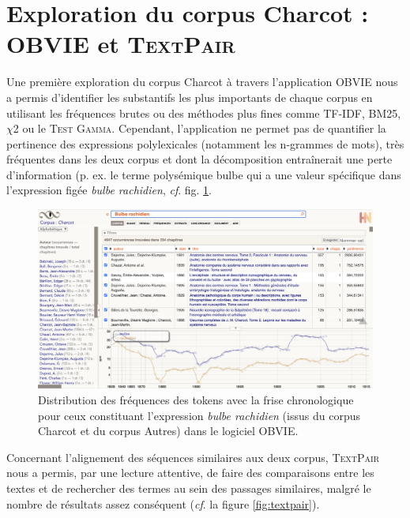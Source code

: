 \label{resultats}

\section{Exploration du corpus Charcot : \textsc{OBVIE} et \textsc{TextPair}}
Une première exploration du corpus Charcot à travers l'application OBVIE nous a permis d'identifier les substantifs les plus importants de chaque corpus en utilisant les fréquences brutes ou des méthodes plus fines comme \textsc{TF-IDF}, \textsc{BM25}, \textsc{$\chi$2} ou le \textsc{Test Gamma}. Cependant, l'application ne permet pas de quantifier la pertinence des expressions polylexicales (notamment les n-grammes de mots), très fréquentes dans les deux corpus et dont la décomposition entraînerait une perte d'information (p. ex. le terme polysémique \og{}bulbe\fg{} qui a une valeur spécifique dans l'expression figée \textit{bulbe rachidien}, \textit{cf}. fig. \ref{fig:bulbe}.
\begin{figure}[!h]
    \centering
    \includegraphics[width=1\textwidth]{img/bulbe_rachidien_mini.png}
    \caption{Distribution des fréquences des tokens avec la frise chronologique pour ceux constituant l'expression \textit{bulbe rachidien} (issus du corpus \og{}Charcot\fg{} et du corpus \og{}Autres\fg{}) dans le logiciel OBVIE. 
    }
    \label{fig:bulbe}
\end{figure}

Concernant l'alignement des séquences similaires aux deux corpus, \textsc{TextPair} nous a permis, par une lecture attentive, de faire des comparaisons entre les textes et de rechercher des termes au sein des passages similaires, malgré le nombre de résultats assez conséquent (\textit{cf}. la figure \ref{fig:textpair}).


